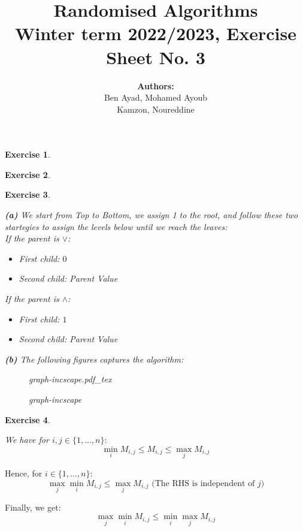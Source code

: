 \documentclass{article}
\title{Randomised Algorithms \\
Winter term 2022/2023, Exercise Sheet No. 3}
\author{
    \textbf{Authors:} \\
    Ben Ayad, Mohamed Ayoub \\
    Kamzon, Noureddine
}
\newcommand{\incfig}[1]{%
    \def\svgwidth{\columnwidth}
    {#1.pdf_tex}
}
\newtheorem{exo}{Exercise}
\begin{document}
\maketitle


\begin{exo}{\ \\}

\end{exo}


\begin{exo}{\ \\}

\end{exo}


\newpage
\begin{exo}{\ \\}

\textbf{(a)}
We start from Top to Bottom, we assign 1 to the root, and follow these two startegies  to assign the levels below until we reach the leaves:\\

If the parent is $\lor$:
\begin{itemize}
    \item First child: $0$
    \item Second child: Parent Value
\end{itemize}

If the parent is $\land$:
\begin{itemize}
    \item First child: $1$
    \item Second child: Parent Value
\end{itemize}

\textbf{(b)} The following figures captures the algorithm:
 
\begin{figure}[ht]
    \centering
    \incfig{graph-incscape}
    \caption{graph-incscape}
    \label{fig:graph-incscape}
\end{figure}


\end{exo}

\begin{exo}{\ \\}


We have for $i,j \in \{1, \dots, n\}\colon$ \[ \min_{i} M_{i,j} \leq M_{i,j} \le \max_{j} M_{i,j}   \]
\end{exo}

Hence, for $i \in \{1, \dots, n\}\colon$ \[ \max_{j} \min_{i} M_{i,j} \le \max_{j} M_{i,j} \text{ (The RHS is independent of $j$)} \]

Finally, we get: \[ \max_{j} \min_{i} M_{i,j} \le  \min_{i} \max_{j} M_{i,j}  \]
\end{document}
